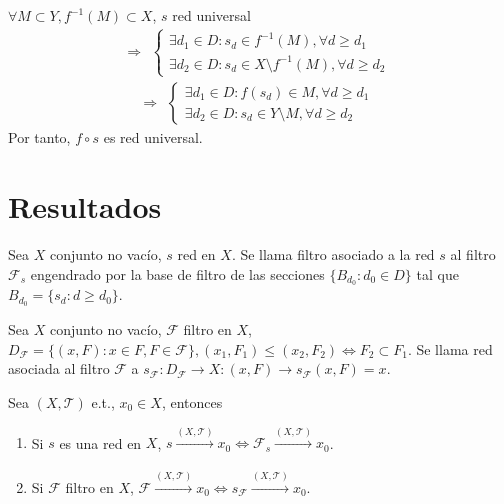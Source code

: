 \begin{dem}
  $\forall M \subset Y, f^{-1}(M) \subset X$, $s$ red universal
  \[ 
    \Rightarrow
    \begin{aligned}
      \begin{cases}
        \exists d_{1} \in D : s_{d} \in f^{-1}(M), \forall d \geq d_{1} \\
        \exists d_{2} \in D : s_{d} \in X \setminus f^{-1}(M), \forall d \geq d_{2}
      \end{cases}
    \end{aligned} 
  \] 
  \[ 
    \Rightarrow
    \begin{aligned}
      \begin{cases}
        \exists d_{1} \in D : f(s_{d}) \in M, \forall d \geq d_{1} \\
        \exists d_{2} \in D : s_{d} \in Y \setminus M, \forall d \geq d_{2}
      \end{cases}
    \end{aligned} 
  \] 
  Por tanto, $f \circ s$ es red universal.
\end{dem}

\section{Resultados}

\begin{defn}
  Sea $X$ conjunto no vacío, $s$ red en $X$. Se llama filtro asociado a la red $s$ al filtro $\mathcal{F}_{s}$ engendrado por la base de filtro de las secciones $\{ B_{d_{0}} : d_{0} \in D \}$ tal que $B_{ d_{ 0 } } = \{ s_{d} : d \geq d_{0} \}$.
\end{defn}

\begin{defn}
Sea $X$ conjunto no vacío, $\mathcal{F}$ filtro en $X$, $D_{\mathcal{F}} = \{ (x, F) : x \in F, F \in \mathcal{F} \}, (x_{1}, F_{1}) \leq (x_{2}, F_{2}) \Leftrightarrow F_{2} \subset F_{1}$. Se llama red asociada al filtro $\mathcal{F}$ a $s_{\mathcal{F}} : D_{\mathcal{F}} \to X : (x, F) \rightarrow s_{\mathcal{F}}(x, F) = x$.
\end{defn}

\begin{prop}
  Sea $( X, \mathcal{T} )$ e.t., $x_{0} \in X$, entonces
  \begin{enumerate}[label=(\roman*)]
    \item Si $s$ es una red en $X$, $s \xrightarrow[]{ ( X, \mathcal{T} ) } x_{0} \Leftrightarrow \mathcal{F}_{s} \xrightarrow[]{ ( X, \mathcal{T} ) } x_{0}$.
    \item Si $\mathcal{F}$ filtro en $X$, $\mathcal{F} \xrightarrow[]{ ( X, \mathcal{T} ) } x_{0} \Leftrightarrow s_{\mathcal{F}} \xrightarrow[]{ ( X, \mathcal{T} ) } x_{0}$.
  \end{enumerate}
\end{prop}

